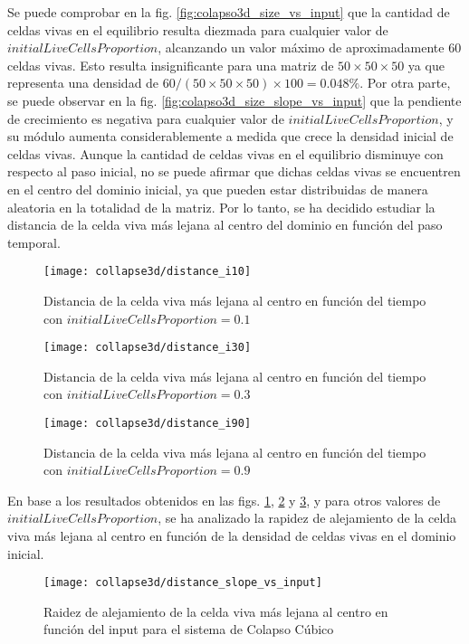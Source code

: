 Se puede comprobar en la fig. \ref{fig:colapso3d_size_vs_input} que la cantidad de celdas vivas en el equilibrio
resulta diezmada para cualquier valor de $initialLiveCellsProportion$, alcanzando un valor máximo de aproximadamente
60 celdas vivas.
Esto resulta insignificante para una matriz de $50 \times 50 \times 50$ ya que representa una densidad
de $60/(50 \times 50 \times 50) \times 100 = 0.048\%$.
Por otra parte, se puede observar en la fig. \ref{fig:colapso3d_size_slope_vs_input} que la pendiente de
crecimiento es negativa para cualquier valor de $initialLiveCellsProportion$, y su módulo aumenta
considerablemente a medida que crece la densidad inicial de celdas vivas.
Aunque la cantidad de celdas vivas en el equilibrio disminuye con respecto al paso inicial, no se puede afirmar
que dichas celdas vivas se encuentren en el centro del dominio inicial, ya que pueden estar distribuidas de manera
aleatoria en la totalidad de la matriz.
Por lo tanto, se ha decidido estudiar la distancia de la celda viva más lejana al centro del dominio en función del
paso temporal.

\begin{figure}[H]
    \centering
    \texttt{[image: collapse3d/distance\_i10]}
    \caption{Distancia de la celda viva más lejana al centro en función del tiempo con $initialLiveCellsProportion = 0.1$}
    \label{fig:colapso3d_d10}
\end{figure}
\begin{figure}[H]
    \centering
    \texttt{[image: collapse3d/distance\_i30]}
    \caption{Distancia de la celda viva más lejana al centro en función del tiempo con $initialLiveCellsProportion = 0.3$}
    \label{fig:colapso3d_d30}
\end{figure}
\begin{figure}[H]
    \centering
    \texttt{[image: collapse3d/distance\_i90]}
    \caption{Distancia de la celda viva más lejana al centro en función del tiempo con $initialLiveCellsProportion = 0.9$}
    \label{fig:colapso3d_d90}
\end{figure}

En base a los resultados obtenidos en las figs. \ref{fig:colapso3d_d10}, \ref{fig:colapso3d_d30} y \ref{fig:colapso3d_d90},
y para otros valores de $initialLiveCellsProportion$, se ha analizado la rapidez de alejamiento de la celda viva más lejana
al centro en función de la densidad de celdas vivas en el dominio inicial.

\begin{figure}[H]
    \centering
    \texttt{[image: collapse3d/distance\_slope\_vs\_input]}
    \caption{Raidez de alejamiento de la celda viva más lejana al centro en función del input para el sistema de Colapso Cúbico}
    \label{fig:colapso3d_distance_slope_vs_input}
\end{figure}

